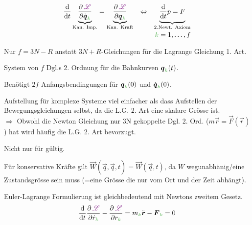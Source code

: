 \begin{defnbox}\nospacing
  \begin{defn}
    \begin{align}
      &\frac{\diff}{\diff t}\underbrace{\frac{\partial\LT}{\partial\dot{\vec{q}}_{\idxk}}}_{\text{Kan. Imp.}}=\underbrace{\frac{\partial\LT}{\partial
        \vec{q}_{\idxk}}}_{\text{Kan. Kraft}}&\Leftrightarrow&&\underbrace{\frac{\diff}{\diff t}p=F}_{2. \text{Newt. Axiom}}\nonumber\nalign
      &&&&\idxk=1,\ldots,f \label{eq:EulerLagrangeGl}
    \end{align}
  \end{defn}
\end{defnbox}
\begin{notebox}[Bemerkungen]
  \begin{numberlist}
      \item Nur $f=3N-R$ anstatt $3N+R$-Gleichungen für die Lagrange
    Gleichung 1. Art.
      \item System von $f$ Dgl.s 2. Ordnung für die Bahnkurven $\vec{q}_{\idxk}(t)$.
      \item Benötigt $2f$ Anfangsbendingungen für $\vec{q}_{\idxk}(0)$ und $\dot{\vec{q}}_{\idxk}(0)$.
      \item Aufstellung für komplexe Systeme viel einfacher als dass
    Aufstellen der Bewegungsgleichungen selbst, da die L.G. 2. Art eine skalare Grösse ist.\\
    $\Rightarrow$ Obwohl die Newton Gleichung nur 3N gekoppelte Dgl. 2. Ord. \big($m \ddot{\vec{r}}=\vec{F}(\vec{r})$\big) hat
    wird häufig die L.G. 2. Art bevorzugt.
      \item Nicht nur für  gültig.
      \item Für konservative Kräfte gilt $\vec{W}(\vec{q},\dot{\vec{q}},t)=\vec{W}(\vec{q},t)$, da $W$ wegunabhänig/eine Zustandsgrösse
    sein muss (=eine Grösse die nur vom Ort und der Zeit abhängt).
      \item Euler-Lagrange Formulierung ist gleichbedeutend mit Newtons zweitem Gesetz.
    \[\frac{\diff}{\diff t}\frac{\partial\LT}{\partial\dot{r}_{\idxk}}-\frac{\partial\LT}{\partial
        r_{\idxk}}=m_{\idxk}\ddot{\vec{r}}-\vec{F}_{\idxk}=0\]
  \end{numberlist}
\end{notebox}
